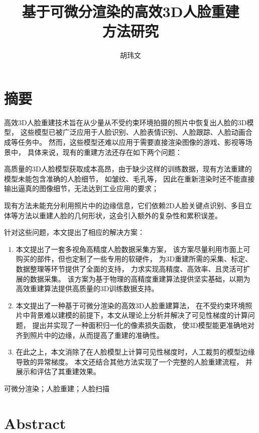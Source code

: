 \documentclass{scutmaster}
\title{基于可微分渲染的高效3D人脸重建\\方法研究}
\author{胡玮文}
\begin{document}
\maketitle
\hideinblind{
    \maketitleEN
    \nominationpage
    \declareoforiginality
}

\frontmatter
\chapter{摘要}

高效3D人脸重建技术旨在从少量从不受约束环境拍摄的照片中恢复出人脸的3D模型，
这些模型已被广泛应用于人脸识别、人脸表情识别、人脸跟踪、人脸动画合成等任务中。
然而，这些模型还难以应用于需要直接渲染图像的游戏、影视等场景中，
具体来说，现有的重建方法还存在如下两个问题：
\begin{enumerate*}
\item 高质量的3D人脸模型获取成本高昂，由于缺少这样的训练数据，现有方法重建的模型未能包含准确的人脸细节，
如皱纹、毛孔等，
因此在重新渲染时还不能直接输出逼真的图像细节，无法达到工业应用的要求；
\item 现有方法未能充分利用照片中的边缘信息，它们依赖2D人脸关键点识别、多目立体等方法以重建人脸的几何形状，这会引入额外的复杂性和累积误差。
\end{enumerate*}

针对这些问题，本文提出了相应的解决方案：
\begin{enumerate}
\item 本文提出了一套多视角高精度人脸数据采集方案，
该方案尽量利用市面上可购买的部件，但也定制了一些专用的软硬件，
为3D重建所需的采集、标定、数据整理等环节提供了全面的支持，
力求实现高精度、高效率、且灵活可扩展的数据采集。
该方案为基于物理的高精度重建算法提供坚实基础，以期为高效重建算法提供高质量的3D训练数据支持。
\item 本文提出了一种基于可微分渲染的高效3D人脸重建算法，
在不受约束环境照片中背景难以建模的前提下，本文从理论上分析并解决了可见性梯度的计算问题，
提出并实现了一种面积归一化的像素损失函数，
使3D模型能更准确地对齐到照片中的边缘，从而提高了重建的准确性。
\item 在此之上，本文消除了在人脸模型上计算可见性梯度时，人工裁剪的模型边缘导致的异常梯度。
本文还结合其他方法实现了一个完整的人脸重建流程，
并展示和评估了其重建效果。
\end{enumerate}

 可微分渲染；人脸重建；人脸扫描

\chapter{Abstract}
\end{document}
